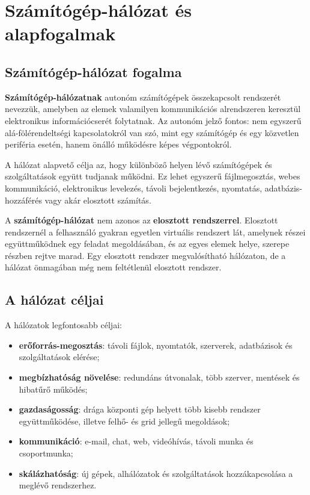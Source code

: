 \section{Számítógép-hálózat és alapfogalmak}

\subsection{Számítógép-hálózat fogalma}

\textbf{Számítógép-hálózatnak} autonóm számítógépek összekapcsolt rendszerét nevezzük, amelyben az elemek valamilyen kommunikációs alrendszeren keresztül elektronikus információcserét folytatnak. Az autonóm jelző fontos: nem egyszerű alá-fölérendeltségi kapcsolatokról van szó, mint egy számítógép és egy közvetlen periféria esetén, hanem önálló működésre képes végpontokról.

A hálózat alapvető célja az, hogy különböző helyen lévő számítógépek és szolgáltatások együtt tudjanak működni. Ez lehet egyszerű fájlmegosztás, webes kommunikáció, elektronikus levelezés, távoli bejelentkezés, nyomtatás, adatbázis-hozzáférés vagy akár elosztott számítás.

A \textbf{számítógép-hálózat} nem azonos az \textbf{elosztott rendszerrel}. Elosztott rendszernél a felhasználó gyakran egyetlen virtuális rendszert lát, amelynek részei együttműködnek egy feladat megoldásában, és az egyes elemek helye, szerepe részben rejtve marad. Egy elosztott rendszer megvalósítható hálózaton, de a hálózat önmagában még nem feltétlenül elosztott rendszer.

\subsection{A hálózat céljai}

A hálózatok legfontosabb céljai:

\begin{itemize}
  \item \textbf{erőforrás-megosztás}: távoli fájlok, nyomtatók, szerverek, adatbázisok és szolgáltatások elérése;
  \item \textbf{megbízhatóság növelése}: redundáns útvonalak, több szerver, mentések és hibatűrő működés;
  \item \textbf{gazdaságosság}: drága központi gép helyett több kisebb rendszer együttműködése, illetve felhő- és grid jellegű megoldások;
  \item \textbf{kommunikáció}: e-mail, chat, web, videóhívás, távoli munka és csoportmunka;
  \item \textbf{skálázhatóság}: új gépek, alhálózatok és szolgáltatások hozzákapcsolása a meglévő rendszerhez.
\end{itemize}

